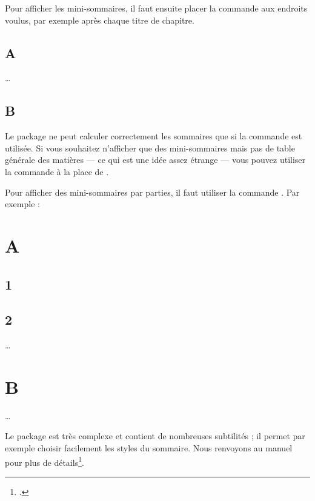 \begin{latexcode}
\usepackage[french]{minitoc}
\dominitoc
\end{latexcode}

Pour afficher les mini-sommaires, il faut ensuite placer la commande  aux endroits voulus, par exemple après chaque titre de chapitre.

\begin{latexcode}
\chapter{A}
\minitoc
…
\chapter{B}
\minitoc
\end{latexcode}

\begin{attention}
Le package ne peut calculer correctement les sommaires que si la commande  est utilisée. Si vous souhaitez n'afficher que des mini-sommaires mais pas de table générale des matières --- ce qui est une idée assez étrange --- vous pouvez utiliser  la commande  à la place de .
\end{attention}

Pour afficher des mini-sommaires par parties, il faut utiliser la commande . Par exemple :

\begin{latexcode}
\part{A}
\parttoc
\chapter{1}
\chapter{2}
…
\part{B}
\parttoc
…
\end{latexcode}


Le package  est très complexe et contient de nombreuses subtilités ; il permet  par exemple choisir facilement les styles du sommaire. Nous renvoyons au manuel pour plus de détails\footcite[Notamment][]{minitoc_typesetting}.

